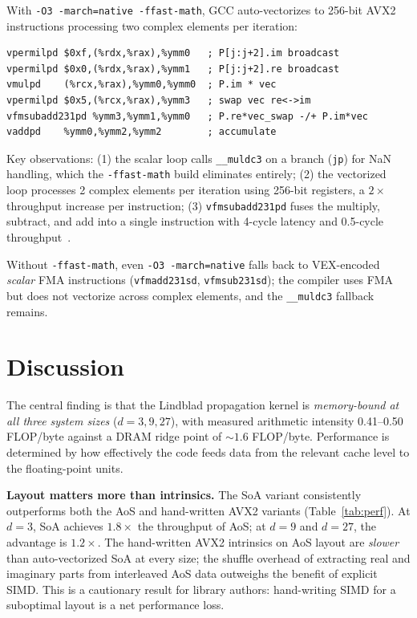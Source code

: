 \documentclass[final,3p,times,twocolumn]{elsarticle}
\begin{document}
With \texttt{-O3 -march=native -ffast-math}, GCC auto-vectorizes to 256-bit
AVX2 instructions processing two complex elements per iteration:

\begin{lstlisting}[language={[x86masm]Assembler},
  caption={Inner loop at \texttt{-O3 -march=native -ffast-math}
           (6 instructions per 2 complex elements). The
           \texttt{vfmsubadd231pd} instruction is the key enabler.},
  label={lst:avx2}]
vpermilpd $0xf,(%rdx,%rax),%ymm0   ; P[j:j+2].im broadcast
vpermilpd $0x0,(%rdx,%rax),%ymm1   ; P[j:j+2].re broadcast
vmulpd    (%rcx,%rax),%ymm0,%ymm0  ; P.im * vec
vpermilpd $0x5,(%rcx,%rax),%ymm3   ; swap vec re<->im
vfmsubadd231pd %ymm3,%ymm1,%ymm0   ; P.re*vec_swap -/+ P.im*vec
vaddpd    %ymm0,%ymm2,%ymm2        ; accumulate
\end{lstlisting}

Key observations: (1) the scalar loop calls \texttt{\_\_muldc3} on a
branch (\texttt{jp}) for NaN handling, which the
\texttt{-ffast-math} build eliminates entirely;
(2) the vectorized loop processes 2 complex elements per iteration using
256-bit registers, a $2\times$ throughput increase per instruction;
(3) \texttt{vfmsubadd231pd} fuses the multiply, subtract, and add into a
single instruction with 4-cycle latency and 0.5-cycle
throughput~\cite{IntelIntrinsics}.

Without \texttt{-ffast-math}, even \texttt{-O3 -march=native} falls back
to VEX-encoded \emph{scalar} FMA instructions (\texttt{vfmadd231sd},
\texttt{vfmsub231sd}); the compiler uses FMA but does not vectorize
across complex elements, and the \texttt{\_\_muldc3} fallback remains.

\section{Discussion}
\label{sec:discussion}

The central finding is that the Lindblad propagation kernel is
\emph{memory-bound at all three system sizes} ($d = 3, 9, 27$), with
measured arithmetic intensity 0.41--0.50 FLOP/byte against a DRAM ridge
point of ${\sim}1.6$ FLOP/byte. Performance is determined by how
effectively the code feeds data from the relevant cache level to the
floating-point units.

\textbf{Layout matters more than intrinsics.}
The SoA variant consistently outperforms both the AoS and hand-written
AVX2 variants (Table~\ref{tab:perf}). At $d = 3$, SoA achieves
$1.8\times$ the throughput of AoS; at $d = 9$ and $d = 27$, the
advantage is $1.2\times$. The hand-written AVX2 intrinsics on AoS layout
are \emph{slower} than auto-vectorized SoA at every size; the shuffle
overhead of extracting real and imaginary parts from interleaved AoS data
outweighs the benefit of explicit SIMD. This is a cautionary result for
library authors: hand-writing SIMD for a suboptimal layout is a net
performance loss.
\end{document}
